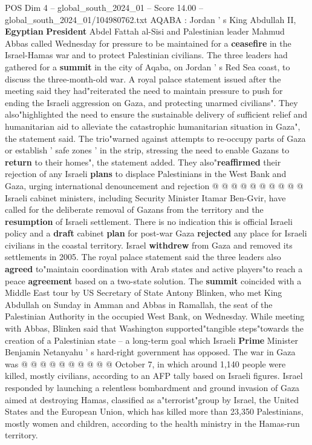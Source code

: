 \begin{textsample}{POS Dim 4 – global\_south\_2024\_01 – Score 14.00 – global\_south\_2024\_01/104980762.txt}  \label{ex:f4_pos_375}
AQABA : Jordan ' s King Abdullah II, \textbf{Egyptian} \textbf{President} Abdel Fattah al-Sisi and Palestinian leader Mahmud Abbas called Wednesday for pressure to be maintained for a \textbf{ceasefire} in the Israel-Hamas war and to protect Palestinian civilians.
The three leaders had gathered for a \textbf{summit} in the city of Aqaba, on Jordan ' s Red Sea coast, to discuss the three-month-old war.
A royal palace statement issued after the meeting said they had"reiterated the need to maintain pressure to push for ending the Israeli aggression on Gaza, and protecting unarmed civilians".
They also"highlighted the need to ensure the sustainable delivery of sufficient relief and humanitarian aid to alleviate the catastrophic humanitarian situation in Gaza", the statement said.
The trio"warned against attempts to re-occupy parts of Gaza or establish ' safe zones ' in the strip, stressing the need to enable Gazans to \textbf{return} to their homes", the statement added.
They also"\textbf{reaffirmed} their rejection of any Israeli \textbf{plans} to displace Palestinians in the West Bank and Gaza, urging international denouncement and rejection @ @ @ @ @ @ @ @ @ @ Israeli cabinet ministers, including Security Minister Itamar Ben-Gvir, have called for the deliberate removal of Gazans from the territory and the \textbf{resumption} of Israeli settlement.
There is no indication this is official Israeli policy and a \textbf{draft} cabinet \textbf{plan} for post-war Gaza \textbf{rejected} any place for Israeli civilians in the coastal territory.
Israel \textbf{withdrew} from Gaza and removed its settlements in 2005.
The royal palace statement said the three leaders also \textbf{agreed} to"maintain coordination with Arab states and active players"to reach a peace \textbf{agreement} based on a two-state solution.
The \textbf{summit} coincided with a Middle East tour by US Secretary of State Antony Blinken, who met King Abdullah on Sunday in Amman and Abbas in Ramallah, the seat of the Palestinian Authority in the occupied West Bank, on Wednesday.
While meeting with Abbas, Blinken said that Washington supported"tangible steps"towards the creation of a Palestinian state -- a long-term goal which Israeli \textbf{Prime} Minister Benjamin Netanyahu ' s hard-right government has opposed.
The war in Gaza was @ @ @ @ @ @ @ @ @ @ October 7, in which around 1,140 people were killed, mostly civilians, according to an AFP tally based on Israeli figures.
Israel responded by launching a relentless bombardment and ground invasion of Gaza aimed at destroying Hamas, classified as a"terrorist"group by Israel, the United States and the European Union, which has killed more than 23,350 Palestinians, mostly women and children, according to the health ministry in the Hamas-run territory.

\end{textsample}
